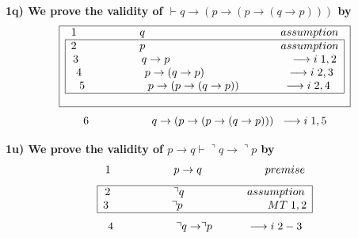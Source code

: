 \documentclass[a4paper]{article}
\begin{document}
\textbf{{\large\hspace{1 cm} 1q) We prove the validity of $\vdash q \rightarrow (p \rightarrow (p \rightarrow (q \rightarrow p)))$ by}}
{\large $$\begin{array}{|c|}
\hline 
\textcolor{black}{1 \hspace{2 cm} q \hspace{4.3 cm} assumption}\\ 
\begin{array}{|c|}
\hline 
\textcolor{black}{2 \hspace{2 cm} p \hspace{4.3 cm} assumption} \\ 
\textcolor{black}{3 \hspace{2 cm} q \rightarrow p \hspace{3.8 cm} \longrightarrow i \hspace{0.1 cm}1,2} \\ 
\textcolor{black}{4 \hspace{2 cm} p \rightarrow (q \rightarrow p) \hspace{2.6 cm} \longrightarrow i \hspace{0.1 cm}2,3} \\ 
\textcolor{black}{5 \hspace{2 cm} p \rightarrow (p \rightarrow (q \rightarrow p)) \hspace{1.4 cm} \longrightarrow i \hspace{0.1 cm}2,4} \\ 
\hline 
\end{array} \\
\\
\hline
\end{array} \\$$ $$\textcolor{black}{6 \hspace{2 cm} q \rightarrow (p \rightarrow (p \rightarrow (q \rightarrow p))) \hspace{0.2 cm} \longrightarrow i \hspace{0.1 cm}1,5} \\ $$}


\textbf{{\large\hspace{1 cm} 1u) We prove the validity of $p \rightarrow q \vdash \urcorner q \rightarrow \urcorner p$ by}}
{\large $$1 \hspace{2 cm} p \rightarrow q \hspace{2 cm} premise$$ 
$$\begin{array}{|c|}
\hline 
\textcolor{black}{2 \hspace{2 cm} \urcorner q \hspace{2 cm} assumption}\\ 

\textcolor{black}{3 \hspace{2 cm} \urcorner p \hspace{2.7 cm} MT\hspace{0.1 cm} 1,2}\\ 
\hline
\end{array}$$ $$4 \hspace{2 cm} \urcorner q \rightarrow \urcorner p \hspace{1.1 cm} \longrightarrow i\hspace{0.1 cm} 2-3$$}\\
\end{document}
